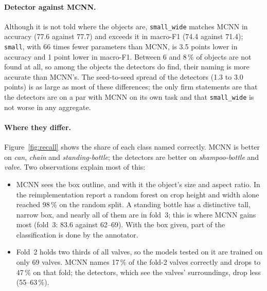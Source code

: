 \documentclass[11pt,a4paper]{article}
\newcommand{\cfg}[1]{\texttt{#1}}
\begin{document}
\paragraph{Detector against MCNN.} Although it is not told where the objects
are, \cfg{small\_wide} matches MCNN in accuracy (77.6 against 77.7) and
exceeds it in macro-F1 (74.4 against 71.4); \cfg{small}, with 66 times fewer
parameters than MCNN, is 3.5 points lower in accuracy and 1 point lower in
macro-F1. Between 6 and 8\,\% of objects are not found at all, so among the
objects the detectors do find, their naming is more accurate than MCNN's.
The seed-to-seed spread of the detectors (1.3 to 3.0 points) is as large as
most of these differences; the only firm statements are that the detectors
are on a par with MCNN on its own task and that \cfg{small\_wide} is not
worse in any aggregate.

\paragraph{Where they differ.} Figure~\ref{fig:recall} shows the share of
each class named correctly. MCNN is better on \emph{can}, \emph{chain} and
\emph{standing-bottle}; the detectors are better on \emph{shampoo-bottle}
and \emph{valve}. Two observations explain most of this:

\begin{itemize}
  \item MCNN sees the box outline, and with it the object's size and aspect
        ratio. In the reimplementation report a random forest on crop
        height and width alone reached 98\,\% on the random split. A
        standing bottle has a distinctive tall, narrow box, and nearly all
        of them are in fold~3; this is where MCNN gains most (fold~3: 83.6
        against 62--69). With the box given, part of the classification is
        done by the annotator.
  \item Fold~2 holds two thirds of all valves, so the models tested on it
        are trained on only 69 valves. MCNN names 17\,\% of the fold-2
        valves correctly and drops to 47\,\% on that fold; the detectors,
        which see the valves' surroundings, drop less (55--63\,\%).
\end{itemize}
\end{document}
